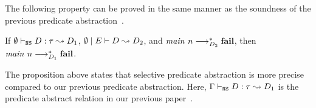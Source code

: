 The following property can be proved in the same manner as the soundness
of the previous predicate abstraction~\cite{KobayashiPLDI2011}.
\begin{proposition}
 If ${\emptyset} \vdash_{\texttt{NS}} {D} : {\tau} \leadsto {D_1}$,
 ${\emptyset} \mid {E} \vdash {D} \leadsto {D_2}$, and
 ${\mathit{main}}~{n} \longrightarrow_{D_2}^* \mathbf{fail}$, then
 ${\mathit{main}}~{n} \longrightarrow_{D_1}^* \mathbf{fail}$.
\end{proposition}
The proposition above states that selective predicate abstraction is
more precise compared to our previous predicate abstraction.  Here,
${\Gamma} \vdash_{\texttt{NS}} {D} : {\tau} \leadsto {D_1}$ is the predicate abstract relation in
our previous paper~\cite{KobayashiPLDI2011}.


%
%
%
%
%
%
%
%
%
%
%
%
%
%
%
%
%
%





